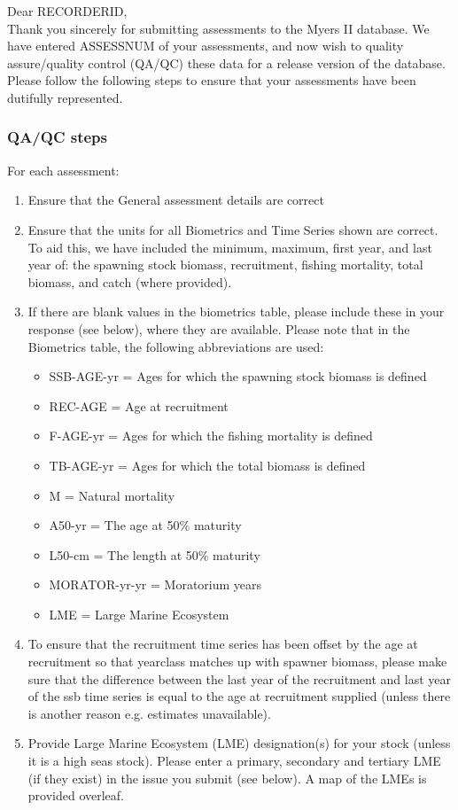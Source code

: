 \documentclass [a4paper, 10pt] {article}
\begin{document}
\noindent Dear RECORDERID,\\

\noindent Thank you sincerely for submitting assessments to the Myers II database. We have entered ASSESSNUM of your assessments, and now wish to quality assure/quality control (QA/QC) these data for a release version of the database. Please follow the following steps to ensure that your assessments have been dutifully represented.
\subsubsection{QA/QC steps}
For each assessment:
\begin{enumerate}
\item Ensure that the General assessment details are correct
\item Ensure that the units for all Biometrics and Time Series shown are correct. To aid this, we have included the minimum, maximum, first year, and last year of: the spawning stock biomass, recruitment, fishing mortality, total biomass, and  catch  (where provided). 
\item If there are blank values in the biometrics table, please include these in your response (see below), where they are available.
Please note that in the Biometrics table, the following abbreviations are used:
\begin{itemize}
\item SSB-AGE-yr  = Ages for which the spawning stock biomass is defined
\item REC-AGE     = Age at recruitment
\item F-AGE-yr    = Ages for which the fishing mortality is defined 
\item TB-AGE-yr   = Ages for which the total biomass is defined
\item M      = Natural mortality
\item A50-yr      = The age at 50\% maturity
\item L50-cm      = The length at 50\% maturity
\item MORATOR-yr-yr = Moratorium years
\item LME = Large Marine Ecosystem\\
\end{itemize}
\item To ensure that the recruitment time series has been offset by the age at recruitment so that yearclass matches up with spawner biomass, please make sure that the difference between the last year of the recruitment and last year of the ssb time series is equal to the age at recruitment supplied (unless there is another reason e.g. estimates unavailable). 
\item Provide Large Marine Ecosystem (LME) designation(s) for your stock (unless it is a high seas stock). Please enter a primary, secondary and tertiary LME (if they exist) in the issue you submit (see below). A map of the LMEs is provided overleaf. 
\end{enumerate}
\vspace{-.25in}
\end{document}
